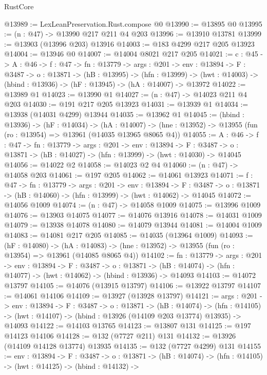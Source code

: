 \begin{lexlean}{RustCore}
\begin{coremodule}
@13989 := LexLeanPreservation.Rust.compose @0
@13990 := @13895 @0
@13995 := (n : @47) -> @13990 @217 @211 @4 @203
@13996 := @13910 @13781
@13999 := @13903 (@13996 @203) @13916
@14003 := @183 @4299 @217 @205 @13923
@14004 := @13946 @0
@14007 := @14004 @8021 @217 @205
@14021 := {c : @45} ->
  {A : @46} ->
  {f : @47} ->
  {fn : @13779} ->
  {args : @201} ->
  {env : @13894} ->
  {F : @3487} ->
  {o : @13871} ->
  (hB : @13995) ->
  (hfn : @13999) -> (hwt : @14003) -> (hbind : @13936) -> (hF : @13945) -> (hA : @14007) -> @13972
@14022 := @13989 @1
@14023 := @13990 @1
@14027 := (n : @47) -> @14023 @211 @4 @203
@14030 := @191 @217 @205 @13923
@14031 := @13939 @1
@14034 := @13938 (@14031 @4299) @13944
@14035 := @13962 @1
@14045 := (hbind : @13936) ->
  (hF : @14034) ->
  (hA : @14007) -> (hne : @13952) -> @13955 (fun (ro : @13954) => @13961 (@14035 @13965 @8065 @4))
@14055 := {A : @46} ->
  {f : @47} ->
  {fn : @13779} ->
  {args : @201} ->
  {env : @13894} ->
  {F : @3487} -> {o : @13871} -> (hB : @14027) -> (hfn : @13999) -> (hwt : @14030) -> @14045
@14056 := @14022 @2
@14058 := @14023 @2 @4
@14060 := (n : @47) -> @14058 @203
@14061 := @197 @205
@14062 := @14061 @13923
@14071 := {f : @47} ->
  {fn : @13779} ->
  {args : @201} ->
  {env : @13894} ->
  {F : @3487} -> {o : @13871} -> (hB : @14060) -> (hfn : @13999) -> (hwt : @14062) -> @14045
@14072 := @14056 @1009
@14074 := (n : @47) -> @14058 @1009
@14075 := @13996 @1009
@14076 := @13903 @14075
@14077 := @14076 @13916
@14078 := @14031 @1009
@14079 := @13938 @14078
@14080 := @14079 @13944
@14081 := @14004 @1009
@14083 := @14081 @217 @205
@14085 := @14035 (@13964 @1009)
@14093 := (hF : @14080) ->
  (hA : @14083) -> (hne : @13952) -> @13955 (fun (ro : @13954) => @13961 (@14085 @8065 @4))
@14102 := {fn : @13779} ->
  {args : @201} ->
  {env : @13894} ->
  {F : @3487} ->
  {o : @13871} -> (hB : @14074) -> (hfn : @14077) -> (hwt : @14062) -> (hbind : @13936) -> @14093
@14103 := @14072 @13797
@14105 := @14076 (@13915 @13797)
@14106 := @13922 @13797
@14107 := @14061 @14106
@14109 := @13927 (@13928 @13797)
@14121 := {args : @201} ->
  {env : @13894} ->
  {F : @3487} ->
  {o : @13871} ->
  (hB : @14074) ->
  (hfn : @14105) -> (hwt : @14107) -> (hbind : @13926 (@14109 @203 @13774) @13935) -> @14093
@14122 := @14103 @13765
@14123 := @13807 @131
@14125 := @197 @14123 @14106
@14128 := @132 (@7727 @211) @131
@14132 := @13926 (@14109 @14128 @13774) @13935
@14135 := @132 (@7727 @4299) @131
@14155 := {env : @13894} ->
  {F : @3487} ->
  {o : @13871} ->
  (hB : @14074) ->
  (hfn : @14105) ->
  (hwt : @14125) ->
  (hbind : @14132) ->

\end{coremodule}
\end{lexlean}
